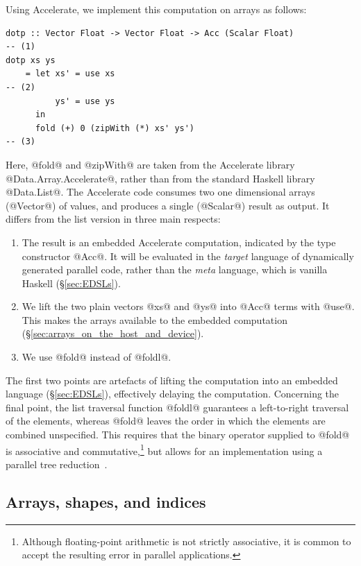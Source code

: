 Using Accelerate, we implement this computation on arrays as follows:
%
\begin{lstlisting}[style=haskell]
dotp :: Vector Float -> Vector Float -> Acc (Scalar Float)                         -- (1)
dotp xs ys
    = let xs' = use xs                                                             -- (2)
          ys' = use ys
      in
      fold (+) 0 (zipWith (*) xs' ys')                                             -- (3)
\end{lstlisting}
%
Here, @fold@ and @zipWith@ are taken from the Accelerate library
@Data.Array.Accelerate@, rather than from the standard Haskell library
@Data.List@. The Accelerate code consumes two one dimensional arrays (@Vector@)
of values, and produces a single (@Scalar@) result as output. It differs from
the list version in three main respects:
%
\begin{enumerate}
    \item The result is an embedded Accelerate computation, indicated by the
        type constructor @Acc@. It will be evaluated in the \emph{target}
        language of dynamically generated parallel code,
        rather than the \emph{meta} language, which is
        vanilla Haskell (\S\ref{sec:EDSLs}).

    \item We lift the two plain vectors @xs@ and @ys@ into @Acc@ terms with
        @use@. This makes the arrays available to the embedded computation
        (\S\ref{sec:arrays_on_the_host_and_device}).

    \item We use @fold@ instead of @foldl@.
\end{enumerate}
%
The first two points are artefacts of lifting the computation into an embedded
language (\S\ref{sec:EDSLs}), effectively delaying the computation. Concerning
the final point, the list traversal function @foldl@ guarantees a left-to-right
traversal of the elements, whereas @fold@ leaves the order in which the elements
are combined unspecified. This requires that the binary operator supplied to
@fold@ is associative and commutative,\footnote{Although floating-point
arithmetic is not strictly associative, it is common to accept the resulting
error in parallel applications.} but allows for an implementation using a
parallel tree reduction~\cite{Chatterjee:1990vj,Sengupta:2007tc}.


\subsection{Arrays, shapes, and indices}
\label{sec:arrays_shapes_and_indices}

